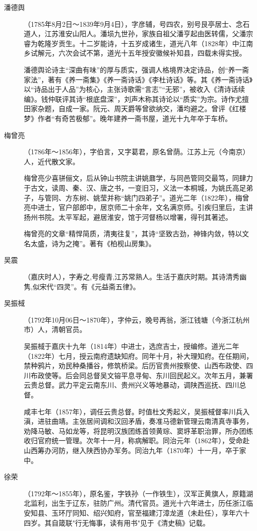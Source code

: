 \begin{description}
  \item[潘德舆] （1785年8月2日～1839年9月4日），字彦辅，号四农，别号艮亭居士、念石道人，江苏淮安山阳人。潘埙九世孙，家族自祖父潘亨起由医转儒，父潘宗睿为乾隆岁贡生。十二岁能诗，十五岁成诸生，道光八年（1828年）中江南乡试解元，六次会试不第，道光十五年授安徽候补知县，四载未得实授。\par
        潘德舆论诗主“深曲有味”的厚与质实，强调人格境界决定诗品，创“养一斋家法”，著有《养一斋集》《养一斋诗话》《李杜诗话》等。其《养一斋诗话》以“诗品出于人品”为核心，主张诗歌需“言志”“无邪”，被收入《清诗话续编》。钱仲联评其诗“根底盘深”，刘声木称其诗论以“质实”为宗。诗作尤擅田家杂题，自成一家。阮元、周天爵等曾欲纳交，潘均避之。曾评《红楼梦》作者“有奇苦极郁”。晚年建养一斋书屋，道光十九年卒于车桥。
  \item[梅曾亮] （1786年～1856年），字伯言，又字葛君，原名曾荫。江苏上元（今南京）人，近代散文家。\par
        梅曾亮少喜骈俪文，后从钟山书院主讲姚鼐学，与同邑管同交最笃，同肆力于古文，读周、秦、汉、唐之书，一变旧习，义法一本桐城，为姚氏高足弟子，与管同、方东树、姚莹并称“姚门四弟子”。道光二年（1822年），梅曾亮中进士，官户部郎中，居京师二十余年，文名满京师。引疾归里后，主讲扬州书院。太平军起，避居淮安，馆于河督杨以增署，得刊其著述。\par
        梅曾亮的文章“精悍简质，清夷往复”，其诗“坚致古劲，神锋内敛，特以文名太盛，诗为之掩”。著有《柏枧山房集》。
  \item[吴震] （嘉庆时人），字寿之,号瘦青,江苏常熟人。生活于嘉庆时期。其诗清秀幽隽,似宋代“四灵”。有《元益斋五律》。
  \item[吴振棫] （1792年10月06日～1870年），字仲云，晚号再翁，浙江钱塘（今浙江杭州市）人，清朝官员。\par
        吴振棫于嘉庆十九年（1814年）中进士，选庶吉士，授编修。道光二年（1822年）七月，授云南府遗缺知府。同年十月，补大理知府。在任期间，禁种鸦片，劝民种桑播谷，修筑桥梁。后历官贵州按察使、山西布政使、四川布政使等。后会同总督吴文镕平息寻甸、东川回民起义。次年五月，兼署云贵总督。武力平定云南东川、贵州兴义等地暴动，调陕西巡抚、四川总督。\par
        咸丰七年（1857年），调任云贵总督。时值杜文秀起义，吴振棫督率川兵入滇，进驻曲靖。主张居间调和汉回矛盾，奏准马德新管理云南清真寺事务，劝降马敏、马如龙等，将昆明汉族团练首领黄琮、窦垿革职治罪，所办团练收归官府统一管理。次年十一月，称病解职。同治元年（1862年），受命赴山西筹办河防，继入陕西协办军务。同治九年（1870年）十一月，卒于家中。
  \item[徐荣] （1792年～1855年），原名鉴，字铁孙（一作铁生），汉军正黄旗人，原籍湖北监利，出生于辽东，驻防广州。清代官员。道光十六年进士，历任浙江临安知县、玉环厅同知、绍兴知府，官至福建汀漳龙道（未赴任），享年六十四岁。其自箴联"行无悔事，读有用书"见于《清史稿》记载。\par

\end{description}
